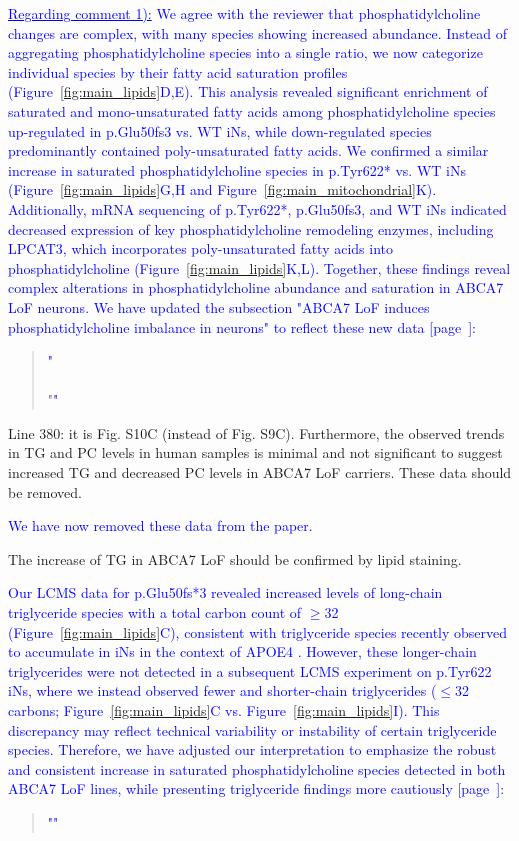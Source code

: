 \textcolor{blue}{\underline{Regarding comment 1):} We agree with the reviewer that phosphatidylcholine changes are complex, with many species showing increased abundance. Instead of aggregating phosphatidylcholine species into a single ratio, we now categorize individual species by their fatty acid saturation profiles (Figure~\ref{fig:main_lipids}D,E). This analysis revealed significant enrichment of saturated and mono-unsaturated fatty acids among phosphatidylcholine species up-regulated in p.Glu50fs3 vs. WT iNs, while down-regulated species predominantly contained poly-unsaturated fatty acids. We confirmed a similar increase in saturated phosphatidylcholine species in p.Tyr622* vs. WT iNs (Figure~\ref{fig:main_lipids}G,H and Figure~\ref{fig:main_mitochondrial}K). Additionally, mRNA sequencing of p.Tyr622*, p.Glu50fs3, and WT iNs indicated decreased expression of key phosphatidylcholine remodeling enzymes, including LPCAT3, which incorporates poly-unsaturated fatty acids into phosphatidylcholine \cite{Zhao2008-pq} (Figure~\ref{fig:main_lipids}K,L). Together, these findings reveal complex alterations in phosphatidylcholine abundance and saturation in ABCA7 LoF neurons. We have updated the subsection "ABCA7 LoF induces phosphatidylcholine imbalance in neurons" to reflect these new data [page~\pageref{quoteA-label}]:}
\begin{quote}
	\textcolor{blue}{"}\quoteA\\\\
	\quoteB"\textcolor{blue}{"}
\end{quote}

Line 380: it is Fig. S10C (instead of Fig. S9C). Furthermore, the observed trends in TG and PC levels in human samples is minimal and not significant to suggest increased TG and decreased PC levels in ABCA7 LoF carriers. These data should be removed.
 
\textcolor{blue}{We have now removed these data from the paper.}

The increase of TG in ABCA7 LoF should be confirmed by lipid staining.

\textcolor{blue}{Our LCMS data for p.Glu50fs*3 revealed increased levels of long-chain triglyceride species with a total carbon count of $\geq$32 (Figure~\ref{fig:main_lipids}C), consistent with triglyceride species recently observed to accumulate in iNs in the context of APOE4 \cite{Haney2024-bp}. However, these longer-chain triglycerides were not detected in a subsequent LCMS experiment on p.Tyr622 iNs, where we instead observed fewer and shorter-chain triglycerides ($\leq$32 carbons; Figure~\ref{fig:main_lipids}C vs. Figure~\ref{fig:main_lipids}I). This discrepancy may reflect technical variability or instability of certain triglyceride species. Therefore, we have adjusted our interpretation to emphasize the robust and consistent increase in saturated phosphatidylcholine species detected in both ABCA7 LoF lines, while presenting triglyceride findings more cautiously [page~\pageref{quoteH-label}]:}
\begin{quote}
	\textcolor{blue}{"\quoteH"}
\end{quote}

